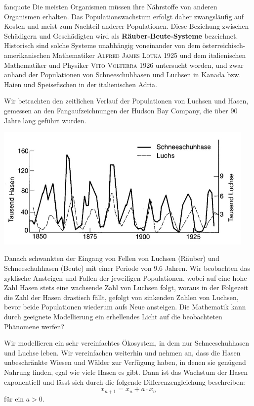 \documentclass[%
<<<<<<< Updated upstream
<<<<<<< Updated upstream
11pt,%
twoside,%
titlepage,%
german,%
headsepline%
]{scrartcl}
\begin{document}
\begin{uebenv}{fanquote}
Die meisten Organismen müssen ihre Nährstoffe von anderen Organismen erhalten. Das Populationswachstum erfolgt daher zwangsläufig auf Kosten und meist zum Nachteil anderer Populationen. Diese Beziehung zwischen Schädigern und Geschädigten wird als \textbf{Räuber-Beute-Systeme} bezeichnet. Historisch sind solche Systeme unabhängig voneinander von dem österreichisch-amerikanischen Mathematiker \textsc{Alfred James Lotka} 1925 und dem italienischen
Mathematiker und Physiker \textsc{Vito Volterra} 1926 untersucht worden, und zwar anhand der Populationen von Schneeschuhhasen und Luchsen in Kanada bzw. Haien und Speisefischen in der italienischen Adria.

Wir betrachten den zeitlichen Verlauf der Populationen von Luchsen
und Hasen, gemessen an den Fangaufzeichnungen der Hudson Bay Company,
die über 90 Jahre lang geführt wurden.

\begin{center}
\includegraphics[height=6cm]{pictures/haseluchs.jpg}
\end{center}

Danach schwankten der Eingang von Fellen von Luchsen (Räuber) und Schneeschuhhasen (Beute) mit einer Periode von 9.6 Jahren. Wir beobachten das zyklische Ansteigen und Fallen der
jeweiligen Populationen, wobei auf eine hohe Zahl Hasen stets eine wachsende Zahl von Luchsen folgt, woraus in der Folgezeit die Zahl der Hasen drastisch fällt, gefolgt von sinkenden Zahlen von Luchsen, bevor beide Populationen wiederum aufs Neue ansteigen. Die Mathematik kann durch geeignete Modellierung ein erhellendes Licht auf die beobachteten Phänomene werfen?

Wir modellieren ein sehr vereinfachtes Ökosystem, in dem nur Schneeschuhhasen und Luchse leben. Wir vereinfachen weiterhin und nehmen an, dass die Hasen unbeschränkte Wiesen und Wälder zur Verfügung haben, in denen sie genügend Nahrung finden, egal wie viele Hasen es gibt. Dann ist das Wachstum der Hasen exponentiell und lässt sich durch die folgende Differenzengleichung beschreiben:
$$x_{n+1}=x_n+a\cdot x_n$$
für ein $a>0$.


\end{uebenv}
\end{document}
